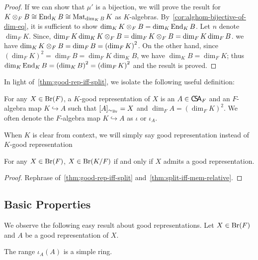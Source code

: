 \begin{proof}
   If we can show that $\mu'$ is a bijection, we will prove the result for $K\otimes_{F} B \cong \operatorname{End}_{K} B \cong \operatorname{Mat}_{\dim_{K} B}K$ as $K$-algebras. By~\cref{cor:alghom-bijective-of-dim-eq}, it is sufficient to show $\dim_{K}K\otimes_{F}B = \dim_{K}\operatorname{End}_{K}B$. Let $n$ denote $\dim_{F}K$. Since, $\dim_{F}K\dim_{K}K\otimes_{F}B =\dim_{F}K\otimes_{F}B=\dim_{F}K \dim_{F}B$. we have $\dim_{K}K\otimes_{F}B = \dim_{F}B = {\left(\dim_{F}K\right)}^{2}$. On the other hand, since ${\left(\dim_{F}K\right)}^{2}=\dim_{F} B = \dim_{F}K\dim_{K}B$, we have $\dim_{K} B = \dim_{F}K$; thus $\dim_{K}\operatorname{End}_{K} B = {\left(\dim_{K}B\right)}^{2}={\left(\dim_{F}K\right)}^{2}$ and the result is proved.
 \end{proof}

 In light of~\cref{thm:good-rep-iff-split}, we isolate the following useful definition:
 \begin{definition}\label{def:good-rep}
   For any $X \in \operatorname{Br}(F)$, a $K$-good representation of $X$ is an $A \in \operatorname{\mathsf{C}\!\mathsf{S}\!\mathsf{A}}_{F}$ and an $F$-algebra map $K \hookrightarrow A$ such that $[A]_{\sim_{\operatorname{Br}}} = X$ and $\dim_{F}A={\left(\dim_{F}K\right)}^{2}$. We often denote the $F$-algebra map $K \hookrightarrow A$ as $\iota$ or $\iota_{A}$.

   \leanok
 \end{definition}

 When $K$ is clear from context, we will simply say good representation instead of $K$-good representation

 \begin{corollary}
   \label{cor:mem-relative-br-iff-good-rep}
   For any $X\in\operatorname{Br}(F)$, $X\in\operatorname{Br}(K/F)$ if and only if $X$ admits a good representation.
   \leanok
 \end{corollary}
 \begin{proof}
   Rephrase of~\cref{thm:good-rep-iff-split} and~\cref{thm:split-iff-mem-relative}.
 \end{proof}

\subsection{Basic Properties}
We observe the following easy result about good representations. Let $X \in \operatorname{Br}(F)$ and $A$ be a good representation of $X$.

\begin{lemma}
  The range $\iota_{A}(A)$ is a simple ring.
  \leanok
\end{lemma}

